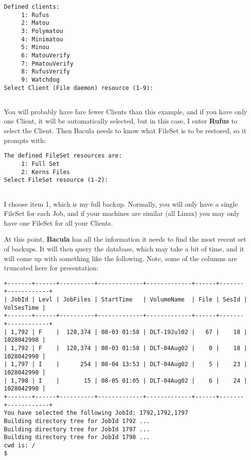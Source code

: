 \footnotesize
\begin{verbatim}
Defined clients:
     1: Rufus
     2: Matou
     3: Polymatou
     4: Minimatou
     5: Minou
     6: MatouVerify
     7: PmatouVerify
     8: RufusVerify
     9: Watchdog
Select Client (File daemon) resource (1-9):
     
\end{verbatim}
\normalsize

You will probably have fare fewer Clients than this example, and  if you have
only one Client, it will be automatically selected, but  in this case, I enter
{\bf Rufus} to select the Client. Then  Bacula needs to know what FileSet is
to be restored, so it  prompts with:  

\footnotesize
\begin{verbatim}
The defined FileSet resources are:
     1: Full Set
     2: Kerns Files
Select FileSet resource (1-2):
     
\end{verbatim}
\normalsize

I choose item 1, which is my full backup. Normally, you will only have a
single FileSet for each Job, and if your machines are similar (all Linux) you
may only have one FileSet for all your Clients. 

At this point, {\bf Bacula} has all the information it needs to find the most
recent set of backups. It will then query the database, which may take a bit
of time, and it will come up with something like the following. Note, some of
the columns are truncated here for presentation: 

\footnotesize
\begin{verbatim}
+-------+------+----------+-------------+-------------+------+-------+------------+
| JobId | Levl | JobFiles | StartTime   | VolumeName  | File | SesId | VolSesTime |
+-------+------+----------+-------------+-------------+------+-------+------------+
| 1,792 | F    |  128,374 | 08-03 01:58 | DLT-19Jul02 |   67 |    18 | 1028042998 |
| 1,792 | F    |  128,374 | 08-03 01:58 | DLT-04Aug02 |    0 |    18 | 1028042998 |
| 1,797 | I    |      254 | 08-04 13:53 | DLT-04Aug02 |    5 |    23 | 1028042998 |
| 1,798 | I    |       15 | 08-05 01:05 | DLT-04Aug02 |    6 |    24 | 1028042998 |
+-------+------+----------+-------------+-------------+------+-------+------------+
You have selected the following JobId: 1792,1792,1797
Building directory tree for JobId 1792 ...
Building directory tree for JobId 1797 ...
Building directory tree for JobId 1798 ...
cwd is: /
$
\end{verbatim}
\normalsize

